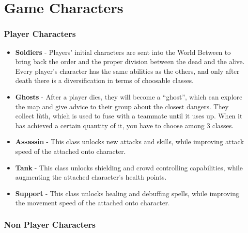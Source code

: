 \documentclass[12pt]{article}
\begin{document}
\newpage

\section{Game Characters}

\subsubsection{Player Characters}

\begin{itemize}
	\item \textbf{Soldiers} - Players’ initial characters are sent into the World Between to bring back the order and the proper division between the dead and the alive. Every player’s character has the same abilities as the others, and only after death there is a diversification in terms of choosable classes.
	\item \textbf{Ghosts} - After a player dies, they will become a “ghost”, which can explore the map and give advice to their group about the closest dangers. They collect lùth, which is used to fuse with a teammate until it uses up. When it has achieved a certain quantity of it, you have to choose among 3 classes.
	\item \textbf{Assassin} - This class unlocks new attacks and skills, while improving attack speed of the attached onto character.
	\item \textbf{Tank} - This class unlocks shielding and crowd controlling capabilities, while augmenting the attached character’s health points.
	\item \textbf{Support} - This class unlocks healing and debuffing spells, while improving the movement speed of the attached onto character.
\end{itemize}

\subsubsection{Non Player Characters}
\end{document}
